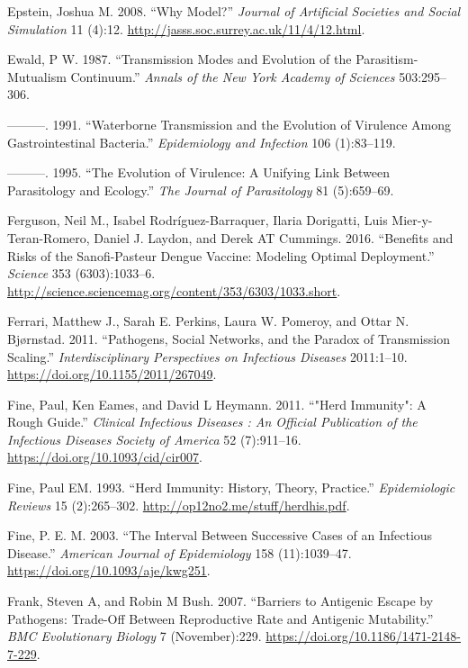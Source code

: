 \documentclass[]{book}
\theoremstyle{definition}
\theoremstyle{definition}
\theoremstyle{definition}
\theoremstyle{remark}
\begin{document}
\leavevmode\hypertarget{ref-epstein08}{}%
Epstein, Joshua M. 2008. ``Why Model?'' \emph{Journal of Artificial
Societies and Social Simulation} 11 (4):12.
\url{http://jasss.soc.surrey.ac.uk/11/4/12.html}.

\leavevmode\hypertarget{ref-ewald87}{}%
Ewald, P W. 1987. ``Transmission Modes and Evolution of the
Parasitism-Mutualism Continuum.'' \emph{Annals of the New York Academy
of Sciences} 503:295--306.

\leavevmode\hypertarget{ref-ewald91}{}%
---------. 1991. ``Waterborne Transmission and the Evolution of
Virulence Among Gastrointestinal Bacteria.'' \emph{Epidemiology and
Infection} 106 (1):83--119.

\leavevmode\hypertarget{ref-ewald95}{}%
---------. 1995. ``The Evolution of Virulence: A Unifying Link Between
Parasitology and Ecology.'' \emph{The Journal of Parasitology} 81
(5):659--69.

\leavevmode\hypertarget{ref-ferguson16}{}%
Ferguson, Neil M., Isabel Rodríguez-Barraquer, Ilaria Dorigatti, Luis
Mier-y-Teran-Romero, Daniel J. Laydon, and Derek AT Cummings. 2016.
``Benefits and Risks of the Sanofi-Pasteur Dengue Vaccine: Modeling
Optimal Deployment.'' \emph{Science} 353 (6303):1033--6.
\url{http://science.sciencemag.org/content/353/6303/1033.short}.

\leavevmode\hypertarget{ref-ferrari11}{}%
Ferrari, Matthew J., Sarah E. Perkins, Laura W. Pomeroy, and Ottar N.
Bjørnstad. 2011. ``Pathogens, Social Networks, and the Paradox of
Transmission Scaling.'' \emph{Interdisciplinary Perspectives on
Infectious Diseases} 2011:1--10.
\url{https://doi.org/10.1155/2011/267049}.

\leavevmode\hypertarget{ref-fine11}{}%
Fine, Paul, Ken Eames, and David L Heymann. 2011. ``"Herd Immunity": A
Rough Guide.'' \emph{Clinical Infectious Diseases : An Official
Publication of the Infectious Diseases Society of America} 52
(7):911--16. \url{https://doi.org/10.1093/cid/cir007}.

\leavevmode\hypertarget{ref-fine93}{}%
Fine, Paul EM. 1993. ``Herd Immunity: History, Theory, Practice.''
\emph{Epidemiologic Reviews} 15 (2):265--302.
\url{http://op12no2.me/stuff/herdhis.pdf}.

\leavevmode\hypertarget{ref-fine03}{}%
Fine, P. E. M. 2003. ``The Interval Between Successive Cases of an
Infectious Disease.'' \emph{American Journal of Epidemiology} 158
(11):1039--47. \url{https://doi.org/10.1093/aje/kwg251}.

\leavevmode\hypertarget{ref-frank07}{}%
Frank, Steven A, and Robin M Bush. 2007. ``Barriers to Antigenic Escape
by Pathogens: Trade-Off Between Reproductive Rate and Antigenic
Mutability.'' \emph{BMC Evolutionary Biology} 7 (November):229.
\url{https://doi.org/10.1186/1471-2148-7-229}.
\end{document}
